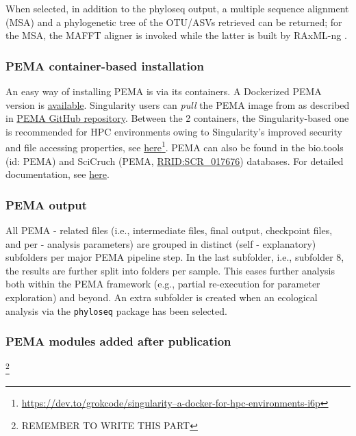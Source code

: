    When selected, in addition to the phyloseq \citep{mcmurdie2013phyloseq} output, a multiple sequence alignment (MSA) and a phylogenetic tree of the OTU/ASVs retrieved can be returned; 
   for the MSA, the MAFFT \citep{katoh2002mafft, nakamura2018parallelization} aligner is invoked while the latter is built by RAxML-ng \citep{kozlov2019raxml}.


   \subsubsection*{PEMA container-based installation}

   An easy way of installing PEMA is via its containers. 
   A Dockerized PEMA version is \href{ https://hub.docker.com/r/hariszaf/pema}{available}. 
   Singularity users can \textit{pull} the PEMA image from as described in \href{https://github.com/hariszaf/pema}{PEMA GitHub repository}. 
   Between the 2 containers, the Singularity-based one is recommended for HPC environments owing to Singularity's improved security and file accessing properties, 
   see \href{https://dev.to/grokcode/singularity--a-docker-for-hpc-environments-i6p}{here}\footnote{\href{https://dev.to/grokcode/singularity--a-docker-for-hpc-environments-i6p}{https://dev.to/grokcode/singularity--a-docker-for-hpc-environments-i6p}}. 
   PEMA can also be found in the bio.tools (id: PEMA) and SciCruch (PEMA, \href{https://scicrunch.org/resolver/RRID:SCR_017676}{RRID:SCR\_017676}) databases. 
   For detailed documentation, see \href{https://hariszaf.github.io/pema_documentation/}{here}.

   \subsubsection*{PEMA output}

   All PEMA - related files (i.e., intermediate files, final output, checkpoint files, and per - analysis parameters) are grouped in distinct (self - explanatory) subfolders per major PEMA pipeline step. 
   In the last subfolder, i.e., subfolder 8, the results are further split into folders per sample. 
   This eases further analysis both within the PEMA framework (e.g., partial re-execution for parameter exploration) and beyond. 
   An extra subfolder is created when an ecological analysis via the \texttt{phyloseq} package has been selected.


   \subsubsection*{PEMA modules added after publication} \footnote{REMEMBER TO WRITE THIS PART}


